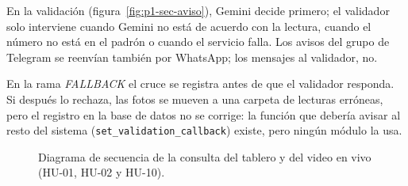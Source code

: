 En la validación (figura~\ref{fig:p1-sec-aviso}), Gemini decide primero;
el validador solo interviene cuando Gemini no está de acuerdo con la
lectura, cuando el número no está en el padrón o cuando el servicio
falla. Los avisos del grupo de Telegram se reenvían también por WhatsApp;
los mensajes al validador, no.

\begin{aviso}[title={Observación del código}]
En la rama \emph{FALLBACK} el cruce se registra antes de que el validador
responda. Si después lo rechaza, las fotos se mueven a una carpeta de
lecturas erróneas, pero el registro en la base de datos no se corrige: la
función que debería avisar al resto del sistema
(\texttt{set\_validation\_callback}) existe, pero ningún módulo la usa.
\end{aviso}

\begin{figure}[htbp]
  \centering
  \caption{Diagrama de secuencia de la consulta del tablero y del video en
           vivo (HU-01, HU-02 y HU-10).}
  \label{fig:p1-sec-tablero}
\end{figure}

